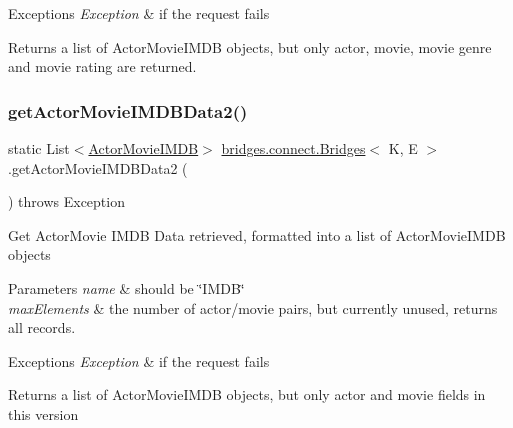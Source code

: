 \begin{DoxyExceptions}{Exceptions}
{\em Exception} & if the request fails\\
\hline
\end{DoxyExceptions}
\begin{DoxyReturn}{Returns}
a list of Actor\+Movie\+I\+M\+DB objects, but only actor, movie, movie genre and movie rating are returned. 
\end{DoxyReturn}
\hypertarget{classbridges_1_1connect_1_1_bridges_a02031d2a33b708588774473d36ba35c2}{}\label{classbridges_1_1connect_1_1_bridges_a02031d2a33b708588774473d36ba35c2} 
\subsubsection{\texorpdfstring{get\+Actor\+Movie\+I\+M\+D\+B\+Data2()}{getActorMovieIMDBData2()}}
{\footnotesize\ttfamily static List$<$\hyperlink{classbridges_1_1data__src__dependent_1_1_actor_movie_i_m_d_b}{Actor\+Movie\+I\+M\+DB}$>$ \hyperlink{classbridges_1_1connect_1_1_bridges}{bridges.\+connect.\+Bridges}$<$ K, E $>$.get\+Actor\+Movie\+I\+M\+D\+B\+Data2 (\begin{DoxyParamCaption}{ }\end{DoxyParamCaption}) throws Exception\hspace{0.3cm}{\ttfamily [static]}}

Get Actor\+Movie I\+M\+DB Data retrieved, formatted into a list of Actor\+Movie\+I\+M\+DB objects


\begin{DoxyParams}{Parameters}
{\em name} & should be \char`\"{}\+I\+M\+D\+B\char`\"{} \\
\hline
{\em max\+Elements} & the number of actor/movie pairs, but currently unused, returns all records. \\
\hline
\end{DoxyParams}

\begin{DoxyExceptions}{Exceptions}
{\em Exception} & if the request fails\\
\hline
\end{DoxyExceptions}
\begin{DoxyReturn}{Returns}
a list of Actor\+Movie\+I\+M\+DB objects, but only actor and movie fields in this version 
\end{DoxyReturn}
\hypertarget{classbridges_1_1connect_1_1_bridges_ae488b9bf0d696adb7f5a6ba7ce4ff2fd}{}\label{classbridges_1_1connect_1_1_bridges_ae488b9bf0d696adb7f5a6ba7ce4ff2fd} 
